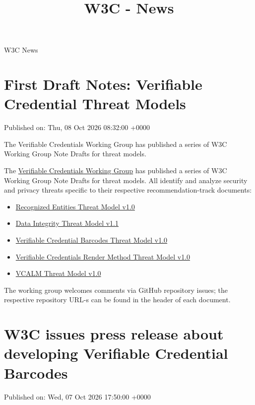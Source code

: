 \documentclass[11pt,a4paper]{article}
\title{W3C - News}
\begin{document}
\maketitle

W3C News

\section{First Draft Notes: Verifiable Credential Threat Models}

Published on: Thu, 08 Oct 2026 08:32:00 +0000

The Verifiable Credentials Working Group has published a series of W3C Working Group Note Drafts for threat models.

The \href{https://www.w3.org/groups/wg/vc}{Verifiable Credentials Working Group} has published a series of W3C Working Group Note Drafts for threat models. All identify and analyze security and privacy threats specific to their respective recommendation-track documents:

\begin{itemize}
\item \href{https://www.w3.org/TR/2026/DNOTE-vc-recognized-entities-threat-model-1.0-20261008/}{Recognized Entities Threat Model v1.0}
\item \href{https://www.w3.org/TR/2026/DNOTE-vc-data-integrity-threat-model-1.1-20261008/}{Data Integrity Threat Model v1.1}
\item \href{https://www.w3.org/TR/2026/DNOTE-vc-barcodes-threat-model-1.0-20261008/}{Verifiable Credential Barcodes Threat Model v1.0}
\item \href{https://www.w3.org/TR/2026/DNOTE-vc-render-method-threat-model-1.0-20261008/}{Verifiable Credentials Render Method Threat Model v1.0}
\item \href{https://www.w3.org/TR/2026/DNOTE-vcalm-threat-model-1.0-20261008/}{VCALM Threat Model v1.0}
\end{itemize}

The working group welcomes comments via GitHub repository issues; the respective repository URL-s can be found in the header of each document.

\section{W3C issues press release about developing Verifiable Credential Barcodes}

Published on: Wed, 07 Oct 2026 17:50:00 +0000
\end{document}
